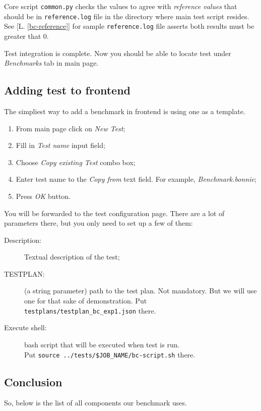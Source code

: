 Core script \texttt{common.py} checks the values to agree with \textit{reference values} that should be in \texttt{reference.log} file in the directory where main test script resides. See [L. \ref{bc-reference}] for sample \texttt{reference.log} file asserts both results must be greater that 0. 

Test integration is complete. Now you should be able to locate test under \textit{Benchmarks} tab in main page.

\subsection{Adding test to frontend}
\label{sec:test-add-frontend}

The simpliest way to add a benchmark in frontend is using one as a template.
\begin{enumerate}
\item From main page click on \textit{New Test};
\item Fill in \textit{Test name} input field;
\item Choose \textit{Copy existing Test} combo box;
\item Enter test name to the \textit{Copy from} text field. For example, \textit{Benchmark.bonnie};
\item Press \textit{OK} button.
\end{enumerate}

You will be forwarded to the test configuration page. There are a lot of parameters there, but you only need to set up a few of them:

\begin{description}
\item[Description:] Textual description of the test;
\item[TESTPLAN:] (a string parameter) path to the test plan. Not mandatory. But we will use one for that sake of demonstration.
  Put \texttt{testplans/testplan\_bc\_exp1.json} there.
\item[Execute shell:] bash script that will be executed when test is run. \\
  Put \texttt{source ../tests/\$JOB\_NAME/bc-script.sh} there.
\end{description}

\subsection{Conclusion}
\label{sec:conslusion}

So, below is the list of all components our benchmark uses.

